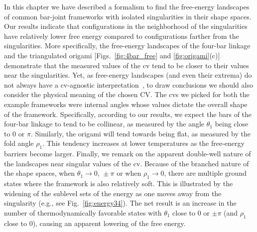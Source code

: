 In this chapter we have described a formalism to find the free-energy landscapes of common bar-joint frameworks with isolated singularities in their shape spaces.
Our results indicate that configurations in the neighborhood of the singularities have relatively lower free energy compared to configurations farther from the singularities.
More specifically, the free-energy landscapes of the four-bar linkage and the triangulated origami [Figs.~\ref{fig:4bar_free} and \ref{fig:origami}(c)] demonstrate that the measured values of the \ac{cv} tend to be closer to their values near the singularities.
Yet, as free-energy landscapes (and even their extrema) do not always have a \ac{cv}-agnostic interpretation~\cite{e2004,hartmann2007,frenkel2013}, to draw conclusions we should also consider the physical meaning of the chosen CV.
The \ac{cv}s we picked for both the example frameworks were internal angles whose values dictate the overall shape of the framework.
Specifically, according to our results, we expect the bars of the four-bar linkage to tend to be collinear, as measured by the angle $\theta_1$ being close to $0$ or $\pi$.
Similarly, the origami will tend towards being flat, as measured by the fold angle $\rho_1$.
This tendency increases at lower temperatures as the free-energy barriers become larger.
Finally, we remark on the apparent double-well nature of the landscapes near singular values of the \ac{cv}.
Because of the branched nature of the shape spaces, when $\theta_{1} \to 0,\,\pm\pi$ or when $\rho_{1} \to 0$, there are multiple ground states where the framework is also relatively soft.
This is illustrated by the widening of the sublevel sets of the energy as one moves away from the singularity (e.g., see Fig.~\ref{fig:energy34}).
The net result is an increase in the number of thermodynamically favorable states with $\theta_{1}$ close to $0$ or $\pm\pi$ (and $\rho_{1}$ close to $0$), causing an apparent lowering of the free energy.

